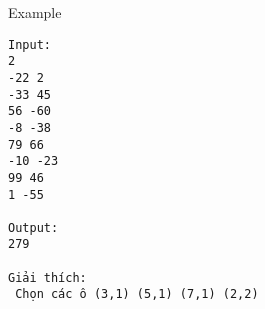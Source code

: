 Example
\begin{verbatim}
Input:
2
-22 2
-33 45
56 -60
-8 -38
79 66
-10 -23
99 46
1 -55

Output:
279

Giải thích:
 Chọn các ô (3,1) (5,1) (7,1) (2,2)

\end{verbatim}
